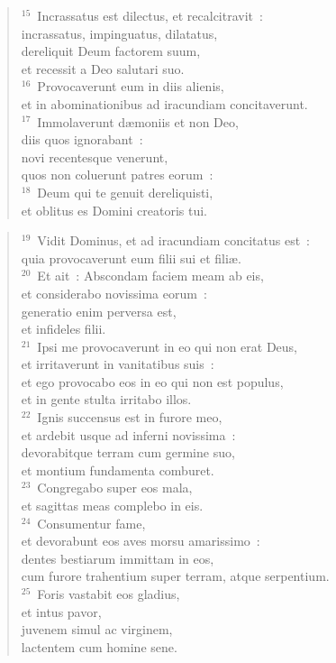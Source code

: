 \begin{verse}${}^{15}$~Incrassatus est dilectus, et recalcitravit~:\\ incrassatus, impinguatus, dilatatus,\\ dereliquit Deum factorem suum,\\ et recessit a Deo salutari suo.\\
${}^{16}$~Provocaverunt eum in diis alienis,\\ et in abominationibus ad iracundiam concitaverunt.\\
${}^{17}$~Immolaverunt d\ae moniis et non Deo,\\ diis quos ignorabant~:\\ novi recentesque venerunt,\\ quos non coluerunt patres eorum~:\\
${}^{18}$~Deum qui te genuit dereliquisti,\\ et oblitus es Domini creatoris tui.\end{verse}


\begin{verse}${}^{19}$~Vidit Dominus, et ad iracundiam concitatus est~:\\ quia provocaverunt eum filii sui et fili\ae .\\
${}^{20}$~Et ait~: Abscondam faciem meam ab eis,\\ et considerabo novissima eorum~:\\ generatio enim perversa est,\\ et infideles filii.\\
${}^{21}$~Ipsi me provocaverunt in eo qui non erat Deus,\\ et irritaverunt in vanitatibus suis~:\\ et ego provocabo eos in eo qui non est populus,\\ et in gente stulta irritabo illos.\\
${}^{22}$~Ignis succensus est in furore meo,\\ et ardebit usque ad inferni novissima~:\\ devorabitque terram cum germine suo,\\ et montium fundamenta comburet.\\
${}^{23}$~Congregabo super eos mala,\\ et sagittas meas complebo in eis.\\
${}^{24}$~Consumentur fame,\\ et devorabunt eos aves morsu amarissimo~:\\ dentes bestiarum immittam in eos,\\ cum furore trahentium super terram, atque serpentium.\\
${}^{25}$~Foris vastabit eos gladius,\\ et intus pavor,\\ juvenem simul ac virginem,\\ lactentem cum homine sene.\end{verse}


